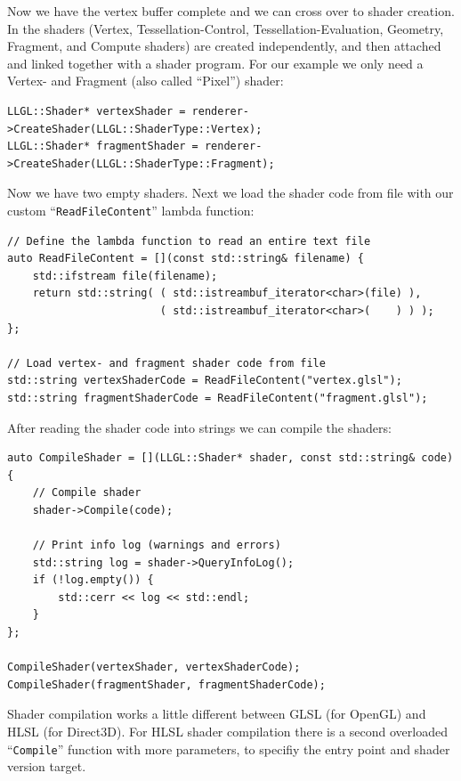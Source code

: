 \documentclass{article}
\begin{document}
Now we have the vertex buffer complete and we can cross over to shader creation.
In \LLGL the shaders (Vertex, Tessellation-Control, Tessellation-Evaluation, Geometry, Fragment, and Compute shaders)
are created independently, and then attached and linked together with a shader program.
For our example we only need a Vertex- and Fragment (also called ``Pixel'') shader:
\begin{lstlisting}
LLGL::Shader* vertexShader = renderer->CreateShader(LLGL::ShaderType::Vertex);
LLGL::Shader* fragmentShader = renderer->CreateShader(LLGL::ShaderType::Fragment);
\end{lstlisting}
Now we have two empty shaders. Next we load the shader code from file with
our custom ``\texttt{ReadFileContent}'' lambda function:
\begin{lstlisting}
// Define the lambda function to read an entire text file
auto ReadFileContent = [](const std::string& filename) {
    std::ifstream file(filename);
    return std::string( ( std::istreambuf_iterator<char>(file) ),
                        ( std::istreambuf_iterator<char>(    ) ) );
};

// Load vertex- and fragment shader code from file
std::string vertexShaderCode = ReadFileContent("vertex.glsl");
std::string fragmentShaderCode = ReadFileContent("fragment.glsl");
\end{lstlisting}

\newpage
\noindent
After reading the shader code into strings we can compile the shaders:
\begin{lstlisting}
auto CompileShader = [](LLGL::Shader* shader, const std::string& code) {
    // Compile shader
    shader->Compile(code);
    
    // Print info log (warnings and errors)
    std::string log = shader->QueryInfoLog();
    if (!log.empty()) {
        std::cerr << log << std::endl;
    }
};

CompileShader(vertexShader, vertexShaderCode);
CompileShader(fragmentShader, fragmentShaderCode);
\end{lstlisting}
Shader compilation works a little different between GLSL (for OpenGL) and HLSL (for Direct3D).
For HLSL shader compilation there is a second overloaded ``\texttt{Compile}'' function with more parameters,
to specifiy the entry point and shader version target.
\end{document}
